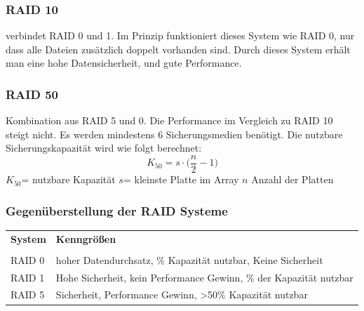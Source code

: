 \documentclass[12pt,a4paper]{article}
\begin{document}
\subsubsection{RAID 10}
    verbindet RAID 0 und 1. Im Prinzip funktioniert dieses System wie RAID 0, nur dass alle Dateien zusätzlich doppelt vorhanden sind. Durch dieses System erhält man eine hohe Datensicherheit, und gute Performance.

\subsubsection{RAID 50}
    Kombination aus RAID 5 und 0. Die Performance im Vergleich zu RAID 10 steigt nicht. Es werden mindestens 6 Sicherungsmedien benötigt. \newline
    Die nutzbare Sicherungskapazität wird wie folgt berechnet:
	\begin{equation*}
		K_{50} = s\cdot \Big(\dfrac{n}{2}-1\Big)
	\end{equation*}
    $K_{50}$= nutzbare Kapazität \hspace{1.5cm} $s$= kleinste Platte im Array \hspace{1.5cm} $n$ Anzahl der Platten

\subsubsection{Gegenüberstellung der RAID Systeme}
	\begin{table}[h]
		\centering
			\begin{tabularx}{15cm}{|XX|}
				\hline
				\textbf{System}&\textbf{Kenngrößen} \\
				& \\
				\hline
				RAID 0& hoher Datendurchsatz, \newline 100\% Kapazität nutzbar, \newline Keine Sicherheit \\
				\hline
				RAID 1& Hohe Sicherheit, \newline kein Performance Gewinn, \newline 50\% der Kapazität nutzbar\\
				\hline
				RAID 5& Sicherheit, \newline Performance Gewinn, \newline >50\% Kapazität nutzbar\\
				\hline
			\end{tabularx}
	\end{table}
	
\end{document}
